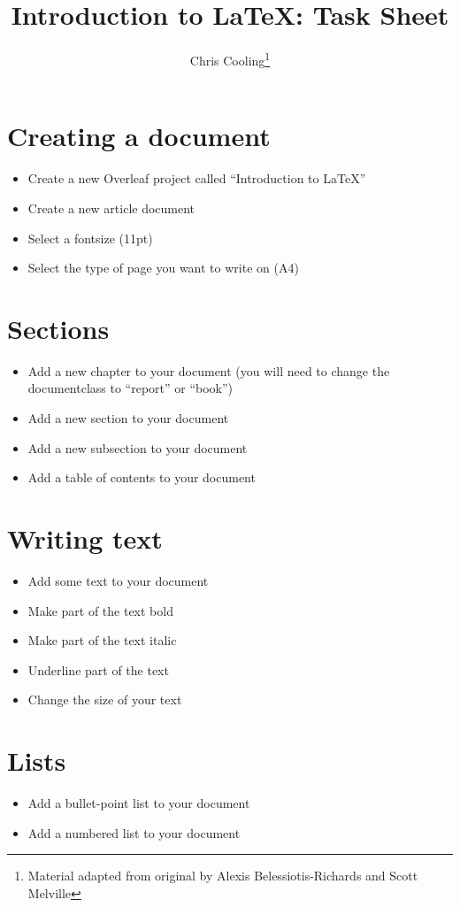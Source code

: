 \documentclass[11pt,a4paper]{article}
\begin{document}
\title{Introduction to \LaTeX: Task Sheet}
\author{Chris Cooling\thanks{Material adapted from original by Alexis Belessiotis-Richards and Scott Melville}}
\maketitle
\pagestyle{empty}
\thispagestyle{empty}

\section{Creating a document}
\begin{itemize}
\item Create a new Overleaf project called ``Introduction to LaTeX''
\item Create a new article document
\item Select a fontsize (11pt)
\item Select the type of page you want to write on (A4)
\end{itemize}

\section{Sections}
\begin{itemize}
\item Add a new chapter to your document (you will need to change the documentclass to ``report'' or ``book'')
\item Add a new section to your document
\item Add a new subsection to your document
\item Add a table of contents to your document
\end{itemize}

\section{Writing text}
\begin{itemize}
\item Add some text to your document
\item Make part of the text bold
\item Make part of the text italic
\item Underline part of the text
\item Change the size of your text
\end{itemize}

\section{Lists}
\begin{itemize}
\item Add a bullet-point list to your document
\item Add a numbered list to your document
\end{itemize}
\end{document}
